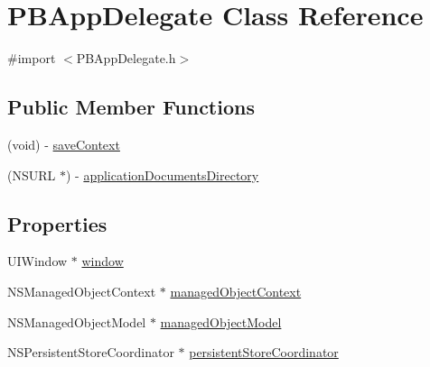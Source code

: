 \hypertarget{interface_p_b_app_delegate}{
\section{PBAppDelegate Class Reference}
\label{interface_p_b_app_delegate}
}


{\ttfamily \#import $<$PBAppDelegate.h$>$}

\subsection*{Public Member Functions}
\begin{DoxyCompactItemize}
\item 
(void) -\/ \hyperlink{interface_p_b_app_delegate_a8decfc0175ef3ecc9571f52ec9eb1fc7}{saveContext}
\item 
(NSURL $\ast$) -\/ \hyperlink{interface_p_b_app_delegate_a13f63ca0981501b3ae86e9931049c2f9}{applicationDocumentsDirectory}
\end{DoxyCompactItemize}
\subsection*{Properties}
\begin{DoxyCompactItemize}
\item 
UIWindow $\ast$ \hyperlink{interface_p_b_app_delegate_ae04748cdefebda525b266731b6c120a2}{window}
\item 
NSManagedObjectContext $\ast$ \hyperlink{interface_p_b_app_delegate_af5d2f65acff5f2c9e7e4ad472f38dfff}{managedObjectContext}
\item 
NSManagedObjectModel $\ast$ \hyperlink{interface_p_b_app_delegate_a688e19e1a5eeabf38cb33bc0e0630950}{managedObjectModel}
\item 
NSPersistentStoreCoordinator $\ast$ \hyperlink{interface_p_b_app_delegate_a11b8c3b6ec8fa5f88cd057beec16a166}{persistentStoreCoordinator}
\end{DoxyCompactItemize}


